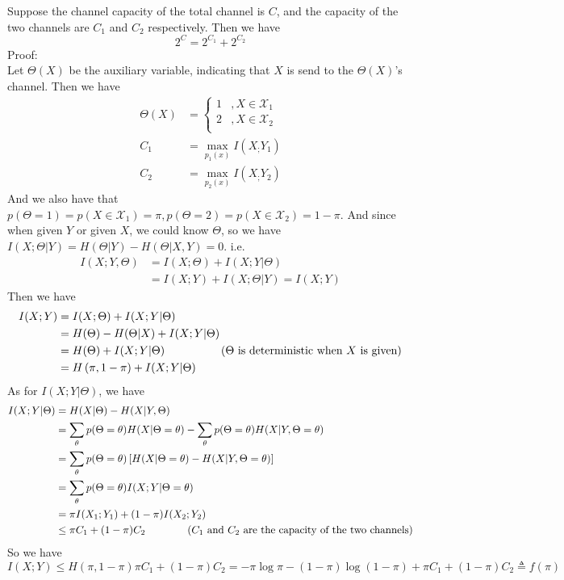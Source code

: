 Suppose the channel capacity of the total channel is $C$, and the capacity of the two channels are $C_1$ and $C_2$ respectively. Then we have
$$2^C=2^{C_1}+2^{C_2}$$
Proof: \\
Let $\Theta(X)$ be the auxiliary variable, indicating that $X$ is send to the $\Theta(X)$'s channel. Then we have
\begin{align*}
\Theta(X) &= \begin{cases}
1 & , X\in \mathcal{X}_1 \\
2 & , X\in \mathcal{X}_2 \\
\end{cases} \\
C_1 &= \max_{p_1(x)}I(X_;Y_1) \\
C_2 &= \max_{p_2(x)}I(X_;Y_2)
\end{align*}
And we also have that $p(\Theta=1)=p(X\in\mathcal{X}_1)=\pi, p(\Theta=2)=p(X\in\mathcal{X}_2)=1-\pi$.
And since when given $Y$ or given $X$, we could know $\Theta$, so we have $I(X;\Theta|Y)=H(\Theta|Y)-H(\Theta|X,Y)=0$.
i.e.
\begin{align*}
I(X;Y,\Theta) &= I(X;\Theta) + I(X;Y|\Theta) \\
&= I(X;Y) + I(X;\Theta|Y) = I(X;Y)
\end{align*}
Then we have
\begin{align*}
I(X;Y) &= I(X;\Theta) + I(X;Y|\Theta) \\
&= H(\Theta) - H(\Theta|X) + I(X;Y|\Theta) \\
&= H(\Theta) + I(X;Y|\Theta) \text{\qquad\qquad\quad ($\Theta$ is deterministic when $X$ is given)} \\
&= H\left(\pi,1-\pi\right) + I(X;Y|\Theta)
\end{align*}
As for $I(X;Y|\Theta)$, we have
\begin{align*}
I(X;Y|\Theta) &= H(X|\Theta) - H(X|Y,\Theta) \\
&= \sum_{\theta}p(\Theta=\theta)H(X|\Theta=\theta) - \sum_{\theta}p(\Theta=\theta)H(X|Y,\Theta=\theta) \\
&= \sum_{\theta}p(\Theta=\theta)\left[H(X|\Theta=\theta) - H(X|Y,\Theta=\theta)\right] \\
&= \sum_{\theta}p(\Theta=\theta)I(X;Y|\Theta=\theta) \\
&= \pi I(X_1;Y_1) + (1-\pi)I(X_2;Y_2) \\
&\leq \pi C_1 + (1-\pi)C_2 \text{\qquad\qquad ($C_1$ and $C_2$ are the capacity of the two channels)}
\end{align*}
So we have
$$I(X;Y) \leq H(\pi,1-\pi) \pi C_1 + (1-\pi)C_2 = -\pi\log \pi - (1-\pi)\log(1-\pi) + \pi C_1 + (1-\pi)C_2 \triangleq f(\pi)$$
